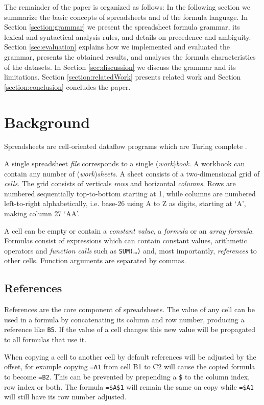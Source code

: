 \documentclass[conference]{IEEEtran}
\begin{document}
The remainder of the paper is organized as follows: In the following section we summarize the basic concepts of spreadsheets and of the formula language. In Section \ref{section:grammar} we present the spreadsheet formula grammar, its lexical and syntactical analysis rules, and details on precedence and ambiguity. Section \ref{sec:evaluation} explains how we implemented and evaluated the grammar, presents the obtained results, and analyses the formula characteristics of the datasets. In Section \ref{sec:discussion} we discuss the grammar and its limitations. Section \ref{section:relatedWork} presents related work and Section \ref{section:conclusion} concludes the paper.

\section{Background}

Spreadsheets are cell-oriented dataflow programs which are Turing complete \cite{ExcelTuringComplete}.

A single spreadsheet \emph{file} corresponds to a single (\emph{work})\emph{book}.
A workbook can contain any number of (\emph{work})\emph{sheets}.
A sheet consists of a two-dimensional grid of \emph{cells}.
The grid consists of verticals \emph{rows} and horizontal \emph{columns}.
Rows are numbered sequentially top-to-bottom starting at 1, while columns are numbered left-to-right alphabetically, i.e. base-26 using A to Z as digits, starting at `A', making column 27 `AA'.

A cell can be empty or contain a \emph{constant value}, a \emph{formula} or an \emph{array formula}.
Formulas consist of expressions which can contain constant values, arithmetic operators and \emph{function calls} such as \texttt{SUM(\ldots)} and, most importantly, \emph{references} to other cells.
Function arguments are separated by commas.

\subsection{References}
References are the core component of spreadsheets.
The value of any cell can be used in a formula by concatenating its column and row number, producing a reference like \texttt{B5}.
If the value of a cell changes this new value will be propagated to all formulas that use it.

When copying a cell to another cell by default references will be adjusted by the offset, for example copying \texttt{=A1} from cell B1 to C2 will cause the copied formula to become \texttt{=B2}.
This can be prevented by prepending a \texttt{\$} to the column index, row index or both.
The formula \texttt{=\$A\$1} will remain the same on copy while \texttt{=\$A1} will still have its row number adjusted.
\end{document}
